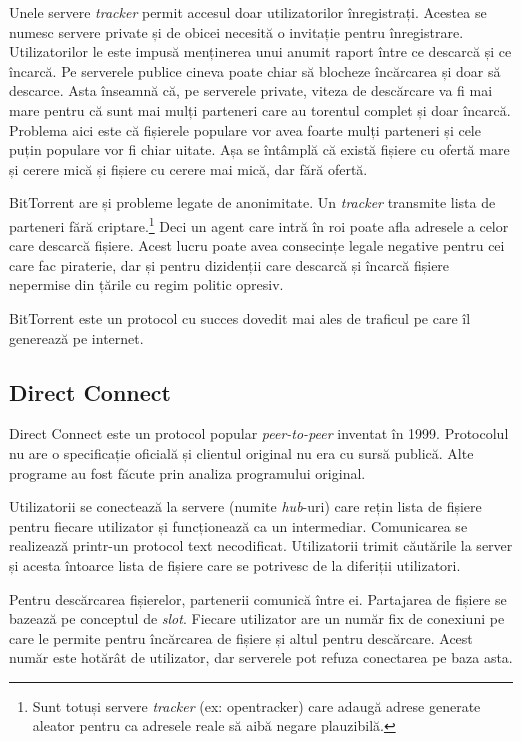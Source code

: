 \documentclass[a4wide,12pt]{report}
\newcommand{\eng}[1]{\emph{#1}} %
\newcommand{\acr}[1]{{\textsmaller[1]{\textsc{#1}}}} %
\begin{document}
Unele servere \eng{tracker} permit accesul doar utilizatorilor înregistrați. Acestea se numesc servere private și de
obicei necesită o invitație pentru înregistrare. Utilizatorilor le este impusă menținerea unui anumit raport între ce
descarcă și ce încarcă. Pe serverele publice cineva poate chiar să blocheze încărcarea și doar să descarce. Asta
înseamnă că, pe serverele private, viteza de descărcare va fi mai mare pentru că sunt mai mulți parteneri care au
torentul complet și doar încarcă. Problema aici este că fișierele populare vor avea foarte mulți parteneri și cele puțin
populare vor fi chiar uitate. Așa se întâmplă că există fișiere cu ofertă mare și cerere mică și fișiere cu cerere mai
mică, dar fără ofertă.

BitTorrent are și probleme legate de anonimitate. Un \eng{tracker} transmite lista de parteneri fără
criptare.\footnote{Sunt totuși servere \eng{tracker} (ex: opentracker) care adaugă adrese generate aleator pentru ca
adresele \acr{IP} reale să aibă negare plauzibilă.} Deci un agent care intră în roi poate afla adresele \acr{IP} a celor
care descarcă fișiere. Acest lucru poate avea consecințe legale negative pentru cei care fac piraterie, dar și pentru
dizidenții care descarcă și încarcă fișiere nepermise din țările cu regim politic opresiv.

BitTorrent este un protocol cu succes dovedit mai ales de traficul pe care îl generează pe internet.

\subsection{Direct Connect} %

Direct Connect este un protocol popular \eng{peer-to-peer} inventat în 1999. Protocolul nu are o specificație oficială
și clientul original nu era cu sursă publică\cite{dircon}. Alte programe au fost făcute prin analiza programului
original.

Utilizatorii se conectează la servere (numite \eng{hub}-uri) care rețin lista de fișiere pentru fiecare utilizator și
funcționează ca un intermediar. Comunicarea se realizează printr-un protocol text necodificat. Utilizatorii trimit
căutările la server și acesta întoarce lista de fișiere care se potrivesc de la diferiții utilizatori. 

Pentru descărcarea fișierelor, partenerii comunică între ei. Partajarea de fișiere se bazează pe conceptul de
\eng{slot}. Fiecare utilizator are un număr fix de conexiuni pe care le permite pentru încărcarea de fișiere și altul
pentru descărcare. Acest număr este hotărât de utilizator, dar serverele pot refuza conectarea pe baza asta.
\end{document}
